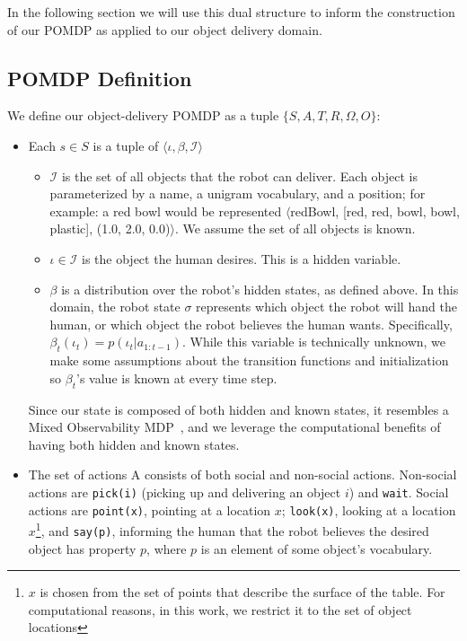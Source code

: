 \documentclass{article}
\newcommand{\Iota}{\mathcal{I}}
\begin{document}
\begin{multicols}{2}
In the following section we will use this dual structure to inform the construction of our POMDP as applied to our object delivery domain. 


\subsection{POMDP Definition}

We define our object-delivery POMDP as a tuple $\{S, A, T, R, \Omega, O\}$: 

\begin{itemize}
	\item Each $s \in S$ is a tuple of $\langle \iota, \beta, \Iota \rangle$		\begin{itemize}
			\item $\Iota$ is the set of all objects that the robot can deliver. Each object is parameterized by a name, a unigram vocabulary, and a position; for example: a red bowl would be represented $\langle$redBowl, [red, red, bowl, bowl, plastic], (1.0, 2.0, 0.0)$\rangle$. We assume the set of all objects is known. 
			\item $\iota \in \Iota$ is the object the human desires. This is a hidden variable. 
			\item $\beta$ is a distribution over the robot's hidden states, as defined above. In this domain, the robot state $\sigma$ represents which object the robot will hand the human, or which object the robot believes the human wants. Specifically, $\beta_t(\iota_t) = p(\iota_t | a_{1:t-1})$. While this variable is technically unknown, we make some assumptions about the transition functions and initialization so $\beta_t$'s value is known at every time step. 
		\end{itemize}
		Since our state is composed of both hidden and known states, it resembles a Mixed Observability MDP~\citep{momdp}, and we leverage the computational benefits of having both hidden and known states. 
	\item The set of actions A consists of both social and non-social actions. Non-social actions are \texttt{pick(i)} (picking up  and delivering an object $i$) and \texttt{wait}. Social actions are \texttt{point(x)}, pointing at a location $x$; \texttt{look(x)}, looking at a location $x$\footnote{$x$ is chosen from the set of points that describe the surface of the table. For computational reasons, in this work, we restrict it to the set of object locations}, and \texttt{say(p)}, informing the human that the robot believes the desired object has property $p$, where $p$ is an element of some object's vocabulary. 

\end{itemize}
\end{multicols}
\end{document}

